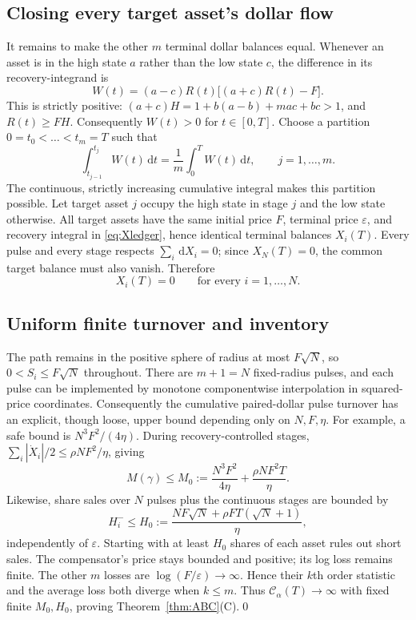\documentclass[11pt]{article}
\numberwithin{equation}{section}
\theoremstyle{definition}
\theoremstyle{remark}
\newcommand{\Cris}{\mathcal{C}}
\newcommand{\dd}{\,\mathrm{d}}
\begin{document}
\subsection{Closing every target asset's dollar flow}
It remains to make the other $m$ terminal dollar balances equal. Whenever an asset is in the high state $a$ rather than the low state $c$, the difference in its recovery-integrand is
\begin{equation}\label{eq:W}
W(t)=(a-c)R(t)\big[(a+c)R(t)-F\big].
\end{equation}
This is strictly positive: $(a+c)H=1+b(a-b)+mac+bc>1$, and $R(t)\ge FH$. Consequently $W(t)>0$ for $t\in[0,T]$. Choose a partition $0=t_0<\dots<t_m=T$ such that
\begin{equation}\label{eq:weights}
\int_{t_{j-1}}^{t_j}W(t)\dd t=\frac1m\int_0^T W(t)\dd t,
\qquad j=1,\ldots,m.
\end{equation}
The continuous, strictly increasing cumulative integral makes this partition possible. Let target asset $j$ occupy the high state in stage $j$ and the low state otherwise. All target assets have the same initial price $F$, terminal price $\varepsilon$, and recovery integral in \eqref{eq:Xledger}, hence identical terminal balances $X_i(T)$. Every pulse and every stage respects $\sum_i\dd X_i=0$; since $X_N(T)=0$, the common target balance must also vanish. Therefore
\begin{equation}\label{eq:allclosed}
X_i(T)=0\qquad\text{for every } i=1,\ldots,N.
\end{equation}

\subsection{Uniform finite turnover and inventory}
The path remains in the positive sphere of radius at most $F\sqrt N$, so $0<S_i\le F\sqrt N$ throughout. There are $m+1=N$ fixed-radius pulses, and each pulse can be implemented by monotone componentwise interpolation in squared-price coordinates. Consequently the cumulative paired-dollar pulse turnover has an explicit, though loose, upper bound depending only on $N,F,\eta$. For example, a safe bound is $N^3F^2/(4\eta)$. During recovery-controlled stages, $\sum_i|\dot X_i|/2\le \rho NF^2/\eta$, giving
\begin{equation}\label{eq:uniformM}
M(\gamma)\le M_0:=\frac{N^3F^2}{4\eta}+\frac{\rho NF^2T}{\eta}.
\end{equation}
Likewise, share sales over $N$ pulses plus the continuous stages are bounded by
\begin{equation}\label{eq:uniformH}
H_i^-\le H_0:=\frac{NF\sqrt N+\rho FT(\sqrt N+1)}\eta,
\end{equation}
independently of $\varepsilon$. Starting with at least $H_0$ shares of each asset rules out short sales. The compensator's price stays bounded and positive; its log loss remains finite. The other $m$ losses are $\log(F/\varepsilon)\to\infty$. Hence their $k$th order statistic and the average loss both diverge when $k\le m$. Thus $\Cris_\alpha(T)\to\infty$ with fixed finite $M_0,H_0$, proving Theorem~\ref{thm:ABC}(C).\qed
\end{document}

